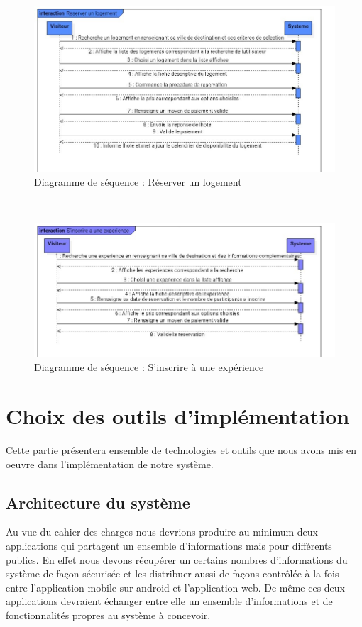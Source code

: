 $ $
\begin{figure}[H]
	\begin{center}
		\includegraphics[width=18cm]{images/uml/SeqReserverLogement.jpg}
	\end{center}
	\caption{Diagramme de séquence : Réserver un logement}
\end{figure}
$ $
\begin{figure}[H]
	\begin{center}
		\includegraphics[width=18cm]{images/uml/SeqInscrireExperience.jpg}
	\end{center}
	\caption{Diagramme de séquence : S’inscrire à une expérience}
\end{figure}

\section{Choix des outils d'implémentation}
Cette partie présentera ensemble de technologies et outils que nous avons
mis en oeuvre dans l’implémentation de notre système.

\subsection{Architecture du système} 
Au vue du cahier des charges nous devrions produire au minimum deux applications qui partagent un ensemble d’informations mais pour différents publics. En effet nous devons récupérer un certains nombres d’informations du système de façon sécurisée et les distribuer aussi de façons contrôlée à la fois entre l’application mobile sur android et l’application web. De même ces deux applications devraient échanger entre elle un ensemble d’informations et de fonctionnalités propres au système à concevoir. 

